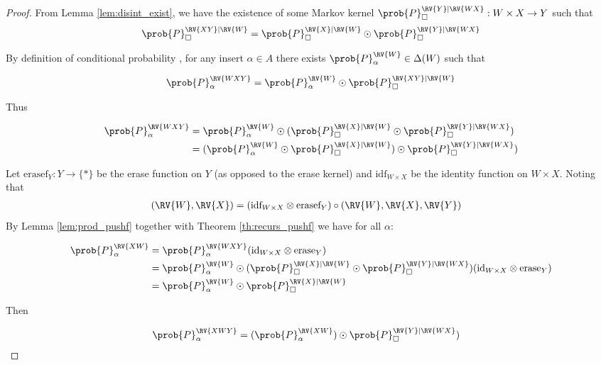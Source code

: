 \begin{proof}
From Lemma \ref{lem:disint_exist}, we have the existence of some Markov kernel $\prob{P}_\square^{\RV{Y}|\RV{WX}}:W\times X\to Y$ such that
\begin{align}
    \prob{P}_\square^{\RV{XY}|\RV{W}}=\prob{P}_\square^{\RV{X}|\RV{W}}\odot \prob{P}_\square^{\RV{Y}|\RV{WX}}\label{eq:k_disint}
\end{align}

By definition of conditional probability , for any insert $\alpha\in A$ there exists $\prob{P}_\alpha^{\RV{W}}\in\Delta(W)$ such that

\begin{align}
    \prob{P}_\alpha^{\RV{WXY}}=\prob{P}_\alpha^{\RV{W}}\odot\prob{P}_\square^{\RV{XY}|\RV{W}}
\end{align}

Thus

\begin{align}
\prob{P}_\alpha^{\RV{WXY}}&= \prob{P}_\alpha^{\RV{W}}\odot(\prob{P}_\square^{\RV{X}|\RV{W}}\odot \prob{P}_\square^{\RV{Y}|\RV{WX}})\\
&= (\prob{P}_\alpha^{\RV{W}}\odot\prob{P}_\square^{\RV{X}|\RV{W}})\odot \prob{P}_\square^{\RV{Y}|\RV{WX}})
\end{align}

Let $\text{erasef}_Y:Y\to \{*\}$ be the erase function on $Y$ (as opposed to the erase kernel) and $\text{idf}_{W\times X}$ be the identity function on $W\times X$. Noting that 
\begin{align}
(\RV{W},\RV{X})&=(\text{idf}_{W\times X}\otimes \text{erasef}_Y)\circ (\RV{W},\RV{X},\RV{Y})
\end{align}
By Lemma \ref{lem:prod_pushf} together with Theorem \ref{th:recurs_pushf} we have for all $\alpha$:

\begin{align}
    \prob{P}_\alpha^{\RV{XW}} &= \prob{P}_\alpha^{\RV{WXY}}(\text{id}_{W\times X}\otimes \text{erase}_Y)\\
                              &= \prob{P}_\alpha^{\RV{W}}\odot(\prob{P}_\square^{\RV{X}|\RV{W}}\odot \prob{P}_\square^{\RV{Y}|\RV{WX}})(\text{id}_{W\times X}\otimes \text{erase}_Y)\\
                              &= \prob{P}_\alpha^{\RV{W}}\odot\prob{P}_\square^{\RV{X}|\RV{W}}
\end{align}

Then

\begin{align}
\prob{P}_\alpha^{\RV{XWY}}&= (\prob{P}_\alpha^{\RV{XW}})\odot \prob{P}_\square^{\RV{Y}|\RV{WX}})
\end{align}


\end{proof}
